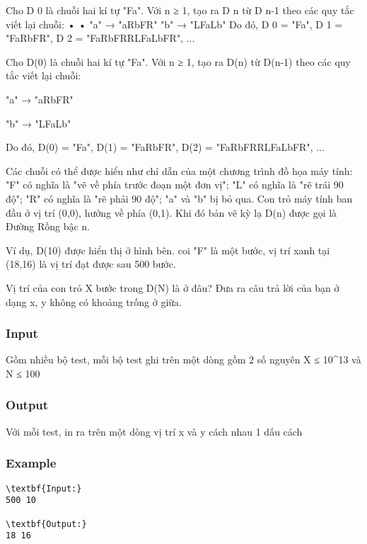 



     Cho D 0 là chuỗi hai kí tự "Fa". Với n ≥ 1, tạo ra D n từ D n-1 theo các quy tắc viết lại chuỗi:       •       •       "a" → "aRbFR"       "b" → "LFaLb"       Do đó, D 0 = "Fa", D 1 = "FaRbFR", D 2 = "FaRbFRRLFaLbFR", ...    

   Cho D(0) là chuỗi hai kí tự "Fa". Với n ≥ 1, tạo ra D(n) từ D(n-1) theo các quy tắc viết lại chuỗi:  

   "a" → "aRbFR"  

   "b" → "LFaLb"  

   Do đó, D(0) = "Fa", D(1) = "FaRbFR", D(2) = "FaRbFRRLFaLbFR", ...  

   Các chuỗi có thể được hiểu như chỉ dẫn của một chương trình đồ họa máy tính: "F" có nghĩa là "vẽ về phía trước đoạn một đơn vị"; "L" có nghĩa là "rẽ trái 90 độ"; "R" có nghĩa là "rẽ phải 90 độ"; "a" và "b" bị bỏ qua. Con trỏ máy tính ban đầu ở vị trí (0,0), hướng về phía (0,1). Khi đó bản vẽ kỳ lạ D(n) được gọi là Đường Rồng bậc n.  

   Ví dụ, D(10) được hiển thị ở hình bên. coi "F" là một bước, vị trí xanh tại (18,16) là vị trí đạt được sau 500 bước.  

   Vị trí của con trỏ X bước trong D(N) là ở đâu? Đưa ra câu trả lời của bạn ở dạng x, y không có khoảng trống ở giữa.  



\subsubsection{   Input  }

   Gồm nhiều bộ test, mỗi bộ test ghi trên một dòng gồm 2 số nguyên X ≤ 10\textasciicircum13 và N ≤ 100  

\subsubsection{   Output  }

   Với mỗi test, in ra trên một dòng vị trí x và y cách nhau 1 dấu cách  

\subsubsection{   Example  }
\begin{verbatim}
\textbf{Input:}
500 10

\textbf{Output:}
18 16
\end{verbatim}